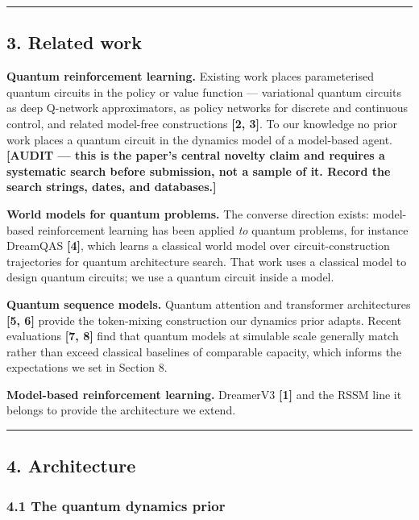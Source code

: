 \documentclass[
  11pt]{article}
\begin{document}
\begin{center}\rule{0.5\linewidth}{0.5pt}\end{center}

\hypertarget{related-work}{%
\subsection{3. Related work}\label{related-work}}

\textbf{Quantum reinforcement learning.} Existing work places
parameterised quantum circuits in the policy or value function ---
variational quantum circuits as deep Q-network approximators, as policy
networks for discrete and continuous control, and related model-free
constructions \textbf{{[}2, 3{]}}. To our knowledge no prior work places
a quantum circuit in the dynamics model of a model-based agent.
\textbf{{[}AUDIT --- this is the paper's central novelty claim and
requires a systematic search before submission, not a sample of it.
Record the search strings, dates, and databases.{]}}

\textbf{World models for quantum problems.} The converse direction
exists: model-based reinforcement learning has been applied \emph{to}
quantum problems, for instance DreamQAS \textbf{{[}4{]}}, which learns a
classical world model over circuit-construction trajectories for quantum
architecture search. That work uses a classical model to design quantum
circuits; we use a quantum circuit inside a model.

\textbf{Quantum sequence models.} Quantum attention and transformer
architectures \textbf{{[}5, 6{]}} provide the token-mixing construction
our dynamics prior adapts. Recent evaluations \textbf{{[}7, 8{]}} find
that quantum models at simulable scale generally match rather than
exceed classical baselines of comparable capacity, which informs the
expectations we set in Section 8.

\textbf{Model-based reinforcement learning.} DreamerV3 \textbf{{[}1{]}}
and the RSSM line it belongs to provide the architecture we extend.

\begin{center}\rule{0.5\linewidth}{0.5pt}\end{center}

\hypertarget{architecture}{%
\subsection{4. Architecture}\label{architecture}}

\hypertarget{the-quantum-dynamics-prior}{%
\subsubsection{4.1 The quantum dynamics
prior}\label{the-quantum-dynamics-prior}}
\end{document}

